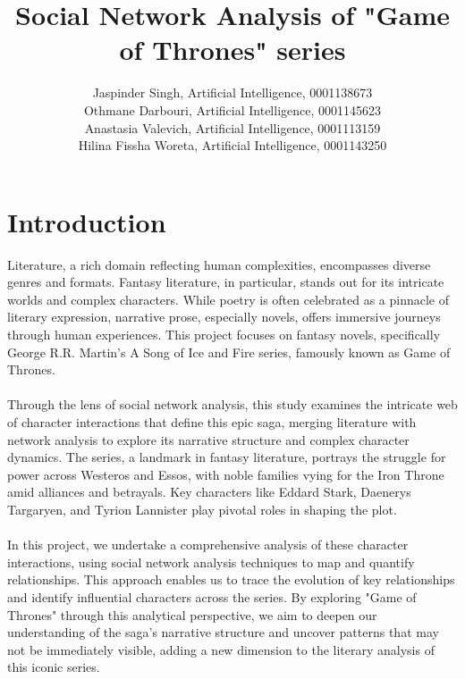 \documentclass[12pt, a4paper]{article}
\author{Jaspinder Singh, Artificial Intelligence, 0001138673 
\\Othmane Darbouri, Artificial Intelligence, 0001145623
\\Anastasia Valevich, Artificial Intelligence, 0001113159
\\Hilina Fissha Woreta, Artificial Intelligence, 0001143250 }
\date{}
\title{Social Network Analysis of "Game of Thrones" series}
\begin{document}
\maketitle

\section{Introduction}

\label{introduction}
Literature, a rich domain reflecting human complexities, encompasses diverse genres and formats. Fantasy literature, in particular, stands out for its intricate worlds and complex characters. While poetry is often celebrated as a pinnacle of literary expression, narrative prose, especially novels, offers immersive journeys through human experiences. This project focuses on fantasy novels, specifically George R.R. Martin's A Song of Ice and Fire series, famously known as Game of Thrones.
\\\\Through the lens of social network analysis, this study examines the intricate web of character interactions that define this epic saga, merging literature with network analysis to explore its narrative structure and complex character dynamics. The series, a landmark in fantasy literature, portrays the struggle for power across Westeros and Essos, with noble families vying for the Iron Throne amid alliances and betrayals. Key characters like Eddard Stark, Daenerys Targaryen, and Tyrion Lannister play pivotal roles in shaping the plot.
\\\\In this project, we undertake a comprehensive analysis of these character interactions, using social network analysis techniques to map and quantify relationships. This approach enables us to trace the evolution of key relationships and identify influential characters across the series. By exploring "Game of Thrones" through this analytical perspective, we aim to deepen our understanding of the saga's narrative structure and uncover patterns that may not be immediately visible, adding a new dimension to the literary analysis of this iconic series.
\end{document}
